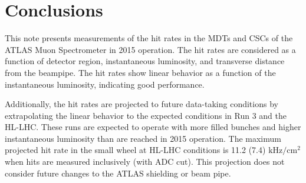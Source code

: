 \section{Conclusions}
\label{sec:conclusions}

This note presents measurements of the hit rates in the MDTs and CSCs of the ATLAS Muon Spectrometer in 2015 operation. The hit rates are considered as a function of detector region, instantaneous luminosity, and transverse distance from the beampipe. The hit rates show linear behavior as a function of the instantaneous luminosity, indicating good performance.

Additionally, the hit rates are projected to future data-taking conditions by extrapolating the linear behavior to the expected conditions in Run 3 and the HL-LHC. These runs are expected to operate with more filled bunches and higher instantaneous luminosity than are reached in 2015 operation. The maximum projected hit rate in the small wheel at HL-LHC conditions is 11.2 (7.4) $\text{kHz} / \text{cm}^2$ when hits are measured inclusively (with ADC cut). This projection does not consider future changes to the ATLAS shielding or beam pipe.

